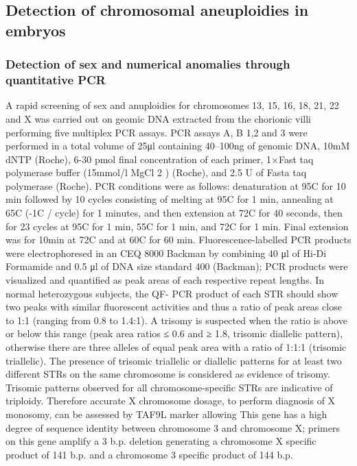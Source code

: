 \subsection*{Detection of chromosomal aneuploidies in embryos} 
\subsubsection*{Detection of sex and numerical anomalies through quantitative PCR}
A rapid screening of sex and anuploidies for chromosomes 13, 15, 16, 18, 21, 22 and X was carried out on geomic DNA extracted from the chorionic villi performing five multiplex PCR assays. PCR assays A, B 1,2 and 3 were performed in a total volume of 25μl containing 40–100ng of genomic DNA, 10mM dNTP (Roche), 6-30 pmol final concentration of each primer, 1×Fast taq polymerase buffer (15mmol/l MgCl 2 ) (Roche), and 2.5 U of Fasta taq polymerase (Roche). PCR conditions were as follows: denaturation at 95\textdegree C for 10 min followed by 10 cycles consisting of melting at 95\textdegree C for 1 min, annealing at 65\textdegree C (-1\textdegree C / cycle) for 1 minutes, and then extension at 72\textdegree C for 40 seconds, then for 23 cycles at 95\textdegree C for 1 min, 55\textdegree C for 1 min, and 72\textdegree C for 1 min. Final extension was for 10min at 72\textdegree C and at 60\textdegree C for 60 min. Fluorescence-labelled PCR products were electrophoresed in an CEQ 8000 Backman by combining 40 μl of Hi-Di Formamide and 0.5 μl of DNA size standard 400 (Backman); PCR products were visualized and quantified as peak areas of each respective repeat lengths. In normal heterozygous subjects, the QF- PCR product of each STR should show two peaks with similar fluorescent activities and thus a ratio of peak areas close to 1:1 (ranging from 0.8 to 1.4:1). A trisomy is suspected when the ratio is  above or below this range (peak area ratios ≤ 0.6 and ≥ 1.8, trisomic diallelic pattern), otherwise there are three alleles of equal peak area with a ratio of 1:1:1 (trisomic triallelic). The presence of trisomic triallelic or diallelic patterns for at least two different STRs on the same chromosome is considered as evidence of trisomy. Trisomic patterns observed for all chromosome-specific STRs are indicative of triploidy. Therefore accurate X chromosome dosage, to perform diagnosis of X monosomy, can be assessed by TAF9L marker allowing This gene has a high degree of sequence identity between chromosome 3 and chromosome X; primers on this gene amplify a 3 b.p. deletion generating a chromosome X specific product of 141 b.p. and a chromosome 3 specific product of 144 b.p.

